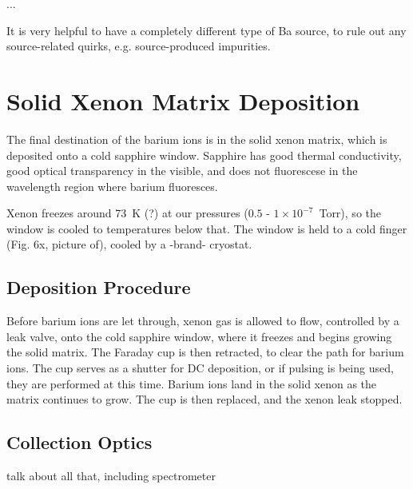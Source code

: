...

It is very helpful to have a completely different type of Ba source, to rule out any source-related quirks, e.g. source-produced impurities.

\section{Solid Xenon Matrix Deposition}

The final destination of the barium ions is in the solid xenon matrix, which is deposited onto a cold sapphire window.  Sapphire has good thermal conductivity, good optical transparency in the visible, and does not fluorescese in the wavelength region where barium fluoresces.  

Xenon freezes around 73~K (?) at our pressures ($0.5$ - $1 \times 10^{-7}$~Torr), so the window is cooled to temperatures below that.  The window is held to a cold finger (Fig. 6x, picture of), cooled by a -brand- cryostat. %

\subsection{Deposition Procedure}

Before barium ions are let through, xenon gas is allowed to flow, controlled by a leak valve, onto the cold sapphire window, where it freezes and begins growing the solid matrix.  The Faraday cup is then retracted, to clear the path for barium ions.  The cup serves as a shutter for DC deposition, or if pulsing is being used, they are performed at this time.  Barium ions land in the solid xenon as the matrix continues to grow.  The cup is then replaced, and the xenon leak stopped.

\subsection{Collection Optics}

talk about all that, including spectrometer